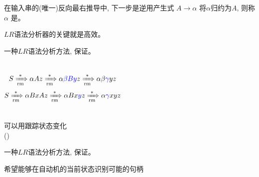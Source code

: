 \begin{frame}{}
  \begin{center}

    \begin{definition}[句柄 (Handle)]
      在输入串的(唯一)反向最右推导中, 下一步是逆用产生式 $A \to \alpha$
      将$\alpha$归约为$A$, 则称 $\alpha$ 是。
    \end{definition}

    \vspace{0.50cm}

    \vspace{0.30cm}
    $LR$语法分析器的关键就是高效。
  \end{center}
\end{frame}

\begin{frame}{}
  \begin{center}

    \begin{theorem}
      一种$LR$语法分析方法, 保证。
    \end{theorem}

    \pause

    \vspace{-0.30cm}
    \begin{columns}
        \[
          S \xRightarrow[\text{rm}]{\ast} \alpha Az \xRightarrow[\text{rm}]{\ast} \alpha\textcolor{blue}{\beta By}z
            \xRightarrow[\text{rm}]{\ast} \alpha\beta\textcolor{blue}{\gamma} yz
        \]
        \[
          S \xRightarrow[\text{rm}]{\ast} \alpha BxAz \xRightarrow[\text{rm}]{\ast} \alpha Bx\textcolor{blue}{y}z \xRightarrow[\text{rm}]{\ast} \alpha\textcolor{blue}{\gamma} xyz
        \]
    \end{columns}
  \end{center}
\end{frame}

\begin{frame}{}
  \begin{center}
    可以用跟踪状态变化 \\[5pt]
    ()

    \begin{theorem}
      一种$LR$语法分析方法, 保证。
    \end{theorem}

    \pause
    \vspace{0.80cm}
    希望能够在自动机的当前状态识别可能的句柄
  \end{center}
\end{frame}

